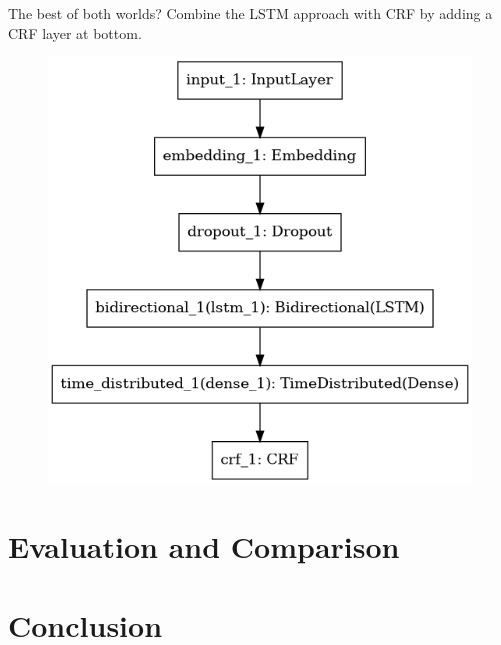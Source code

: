 \documentclass[12pt, tikz]{beamer}
\begin{document}
\begin{frame}[fragile]{The best of both worlds?}
	Combine the LSTM approach with CRF by adding a CRF layer at bottom.
	\begin{figure}
		\includegraphics[width=0.65\textheight]{img/lstm_crf_model.png}
	\end{figure}
\end{frame}


\section{Evaluation and Comparison}

\section{Conclusion}


\end{document}
